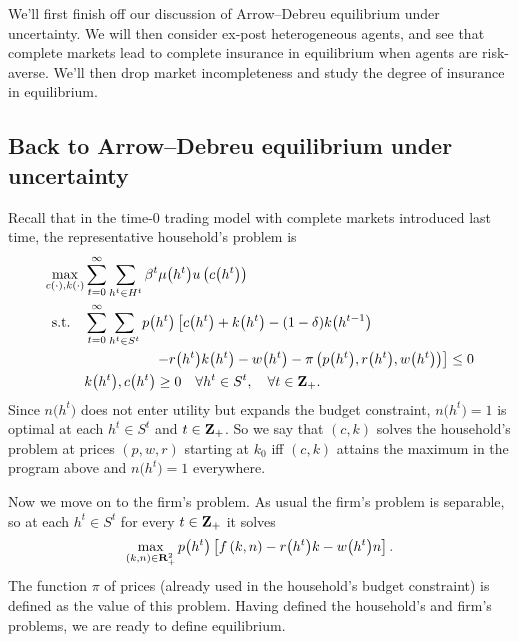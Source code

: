 \documentclass[11pt,letterpaper,reqno,oneside]{article}
\begin{document}
We'll first finish off our discussion of Arrow--Debreu equilibrium under uncertainty. We will then consider ex-post heterogeneous agents, and see that complete markets lead to complete insurance in equilibrium when agents are risk-averse. We'll then drop market incompleteness and study the degree of insurance in equilibrium.



\subsection{Back to Arrow--Debreu equilibrium under uncertainty}
\label{sec:19Oct2015:back_to_AD_uncertainty}

Recall that in the time-0 trading model with complete markets introduced last time, the representative household's problem is
%
\begin{align*}
	\max_{ c(\cdot),k(\cdot) } 
	&\sum_{t=0}^\infty \sum_{ h^t \in H^t }
	\beta^t \mu\bigl(h^t\bigr) u\left( c\bigl(h^t\bigr) \right)
	\\
	\text{s.t.}\quad
	&\sum_{t=0}^\infty \sum_{h^t \in S^t} 
	p\bigl(h^t\bigr)
	\left[ c\bigl(h^t\bigr) + k\bigl(h^t\bigr) 
	- (1-\delta) k\bigl(h^{t-1}\bigr) 
	\right.
	\\
	&\quad\quad\quad\quad\quad
	\left. 
	- r\bigl(h^t\bigr) k\bigl(h^t\bigr) - w\bigl(h^t\bigr)
	- \pi\left( p\bigl(h^t\bigr), r\bigl(h^t\bigr), w\bigl(h^t\bigr) \right) 
	\right] \leq 0
	\\
	&k\bigl(h^t\bigr), c\bigl(h^t\bigr) \geq 0
	\quad\forall h^t \in S^t, \quad \forall t \in \mathbf{Z}_+ .
\end{align*}
%
Since $n\bigl(h^t\bigr)$ does not enter utility but expands the budget constraint, $n\bigl(h^t\bigr) = 1$ is optimal at each $h^t \in S^t$ and $t \in \mathbf{Z}_+$. So we say that $(c,k)$ solves the household's problem at prices $(p,w,r)$ starting at $k_0$ iff $(c,k)$ attains the maximum in the program above and $n\bigl(h^t\bigr) = 1$ everywhere.

Now we move on to the firm's problem. As usual the firm's problem is separable, so at each $h^t \in S^t$ for every $t \in \mathbf{Z}_+$ it solves
%
\begin{equation*}
	\max_{ \left( k,n \right) \in \mathbf{R}^2_+ } 
	p\bigl(h^t\bigr) \left[ 
	f\left( k,n \right)
	- r\bigl(h^t\bigr) k - w\bigl(h^t\bigr) n
	\right] .
\end{equation*}
%
The function $\pi$ of prices (already used in the household's budget constraint) is defined as the value of this problem. Having defined the household's and firm's problems, we are ready to define equilibrium.
\end{document}
